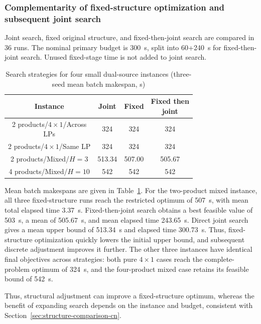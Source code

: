 \documentclass[final,5p,times,twocolumn]{elsarticle}
\begin{document}
\subsubsection{Complementarity of fixed-structure optimization and subsequent joint search}
\label{sec:journal-structure-cn}
Joint search, fixed original structure, and fixed-then-joint search are compared in 36 runs. The nominal primary budget is 300~s, split into 60+240~s for fixed-then-joint search. Unused fixed-stage time is not added to joint search.


\begin{table}[!htbp]
\centering\small
\caption{Search strategies for four small dual-source instances (three-seed mean batch makespan, s)}
\label{tab:journal-structure-cn}
\setlength{\tabcolsep}{3pt}
\begin{tabular}{cccc}\toprule
Instance & Joint & Fixed & \makecell[c]{Fixed then\\joint}\\\midrule
2 products/$4\times1$/\makecell[c]{Across\\LPs} & 324 & 324 & 324\\
2 products/$4\times1$/Same LP & 324 & 324 & 324\\
2 products/Mixed/$H=3$ & 513.34 & 507.00 & 505.67\\
4 products/Mixed/$H=10$ & 542 & 542 & 542\\
\bottomrule\end{tabular}
\end{table}


Mean batch makespans are given in Table~\ref{tab:journal-structure-cn}. For the two-product mixed instance, all three fixed-structure runs reach the restricted optimum of 507~s, with mean total elapsed time 3.37~s. Fixed-then-joint search obtains a best feasible value of 503~s, a mean of 505.67~s, and mean elapsed time 243.65~s. Direct joint search gives a mean upper bound of 513.34~s and elapsed time 300.73~s. Thus, fixed-structure optimization quickly lowers the initial upper bound, and subsequent discrete adjustment improves it further. The other three instances have identical final objectives across strategies: both pure $4\times1$ cases reach the complete-problem optimum of 324~s, and the four-product mixed case retains its feasible bound of 542~s.

Thus, structural adjustment can improve a fixed-structure optimum, whereas the benefit of expanding search depends on the instance and budget, consistent with Section~\ref{sec:structure-comparison-cn}.
\end{document}
